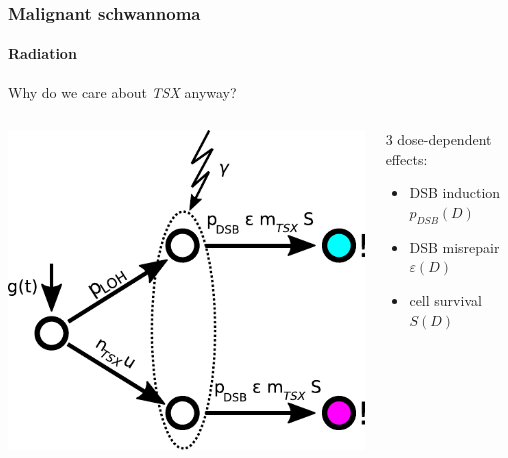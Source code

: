 \documentclass{beamer}
\begin{document}
\begin{frame}
    \frametitle{Malignant schwannoma}
    \framesubtitle{Radiation}

    \begin{center}
        \tiny{Why do we care about \emph{TSX} anyway?}
    \end{center}

    \begin{columns}
        \begin{column}{0.5\textwidth}
        \includegraphics[width=\textwidth]{figures/radiation-model}
        \end{column}
        \begin{column}{0.5\textwidth}
        3 dose-dependent effects:
        \begin{itemize}
            \item DSB induction $p_{DSB}(D)$
            \item DSB misrepair $\varepsilon(D)$
            \item cell survival $S(D)$
        \end{itemize}
        \end{column}
    \end{columns}
\end{frame}
\end{document}
